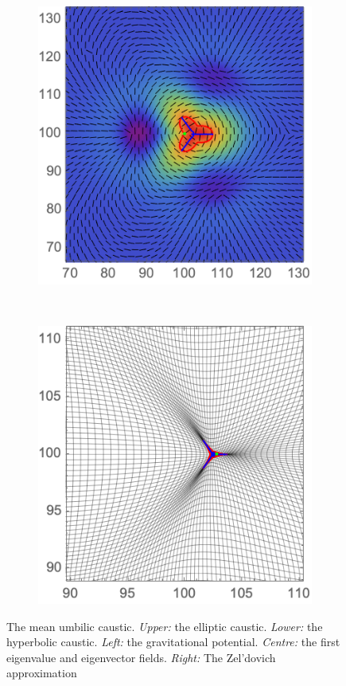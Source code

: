 \documentclass[a4paper, 11pt]{article}
\begin{document}
\begin{figure}
\begin{subfigure}[b]{0.32\textwidth}
\end{subfigure}~
\begin{subfigure}[b]{0.32\textwidth}
\includegraphics[width=\textwidth]{Hyperbolic_mean_L}
\end{subfigure}~
\begin{subfigure}[b]{0.32\textwidth}
\includegraphics[width=\textwidth]{Hyperbolic_mean_Z}
\end{subfigure}
\caption{The mean umbilic caustic. \textit{Upper:} the  elliptic caustic. \textit{Lower:} the hyperbolic caustic. \textit{Left:} the gravitational potential. \textit{Centre:} the first eigenvalue and eigenvector fields. \textit{Right:} The Zel'dovich approximation}\label{fig:meanHyperbolic}
\end{figure}
\end{document}
